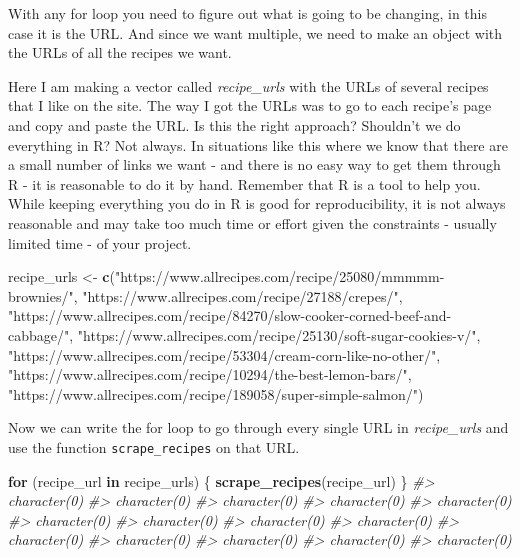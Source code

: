\documentclass[
  12pt,
]{book}
\newenvironment{Shaded}{\begin{snugshade}}{\end{snugshade}}
\newcommand{\CommentTok}[1]{\textcolor[rgb]{0.37,0.37,0.37}{\textit{#1}}}
\newcommand{\ControlFlowTok}[1]{\textcolor[rgb]{0.27,0.27,0.27}{\textbf{#1}}}
\newcommand{\KeywordTok}[1]{\textcolor[rgb]{0.27,0.27,0.27}{\textbf{#1}}}
\newcommand{\NormalTok}[1]{#1}
\newcommand{\StringTok}[1]{\textcolor[rgb]{0.5,0.5,0.5}{#1}}
\begin{document}
With any for loop you need to figure out what is going to be changing, in this case it is the URL. And since we want multiple, we need to make an object with the URLs of all the recipes we want.

Here I am making a vector called \emph{recipe\_urls} with the URLs of several recipes that I like on the site. The way I got the URLs was to go to each recipe's page and copy and paste the URL. Is this the right approach? Shouldn't we do everything in R? Not always. In situations like this where we know that there are a small number of links we want - and there is no easy way to get them through R - it is reasonable to do it by hand. Remember that R is a tool to help you. While keeping everything you do in R is good for reproducibility, it is not always reasonable and may take too much time or effort given the constraints - usually limited time - of your project.

\begin{Shaded}
\begin{Highlighting}[]
\NormalTok{recipe\_urls <{-}}\StringTok{ }\KeywordTok{c}\NormalTok{(}\StringTok{"https://www.allrecipes.com/recipe/25080/mmmmm{-}brownies/"}\NormalTok{,}
                 \StringTok{"https://www.allrecipes.com/recipe/27188/crepes/"}\NormalTok{,}
                 \StringTok{"https://www.allrecipes.com/recipe/84270/slow{-}cooker{-}corned{-}beef{-}and{-}cabbage/"}\NormalTok{,}
                 \StringTok{"https://www.allrecipes.com/recipe/25130/soft{-}sugar{-}cookies{-}v/"}\NormalTok{,}
                 \StringTok{"https://www.allrecipes.com/recipe/53304/cream{-}corn{-}like{-}no{-}other/"}\NormalTok{,}
                 \StringTok{"https://www.allrecipes.com/recipe/10294/the{-}best{-}lemon{-}bars/"}\NormalTok{,}
                 \StringTok{"https://www.allrecipes.com/recipe/189058/super{-}simple{-}salmon/"}\NormalTok{)}
\end{Highlighting}
\end{Shaded}

Now we can write the for loop to go through every single URL in \emph{recipe\_urls} and use the function \texttt{scrape\_recipes} on that URL.

\begin{Shaded}
\begin{Highlighting}[]
\ControlFlowTok{for}\NormalTok{ (recipe\_url }\ControlFlowTok{in}\NormalTok{ recipe\_urls) \{}
  \KeywordTok{scrape\_recipes}\NormalTok{(recipe\_url)}
\NormalTok{\}}
\CommentTok{\#> character(0)}
\CommentTok{\#> character(0)}
\CommentTok{\#> character(0)}
\CommentTok{\#> character(0)}
\CommentTok{\#> character(0)}
\CommentTok{\#> character(0)}
\CommentTok{\#> character(0)}
\CommentTok{\#> character(0)}
\CommentTok{\#> character(0)}
\CommentTok{\#> character(0)}
\CommentTok{\#> character(0)}
\CommentTok{\#> character(0)}
\CommentTok{\#> character(0)}
\CommentTok{\#> character(0)}
\end{Highlighting}
\end{Shaded}
\end{document}
